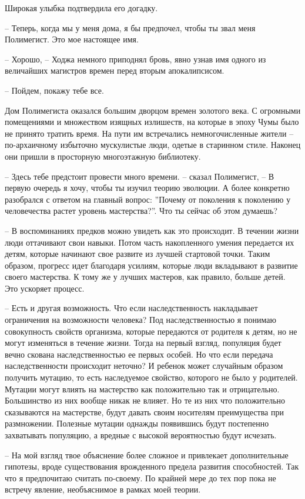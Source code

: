 \documentclass[12pt,a4paper]{article}
\begin{document}
Широкая улыбка подтвердила его догадку.

-- Теперь, когда мы у меня дома, я бы предпочел, чтобы ты звал меня Полимегист. Это мое настоящее имя.

-- Хорошо, -- Ходжа немного приподнял бровь, явно узнав имя одного из величайших магистров времен перед вторым апокалипсисом.

-- Пойдем, покажу тебе все.

Дом Полимегиста оказался большим дворцом времен золотого века. С огромными помещениями и множеством изящных излишеств, на которые в эпоху Чумы было не принято тратить время. На пути им встречались немногочисленные жители -- по-архаичному избыточно мускулистые люди, одетые в старинном стиле. Наконец они пришли в просторную многоэтажную библиотеку.

-- Здесь тебе предстоит провести много времени. -- сказал Полимегист, -- В первую очередь я хочу, чтобы ты изучил теорию эволюции. А более конкретно разобрался с ответом на главный вопрос: ''Почему от поколения к поколению у человечества растет уровень мастерства?''. Что ты сейчас об этом думаешь?

-- В воспоминаниях предков можно увидеть как это происходит. В течении жизни люди оттачивают свои навыки. Потом часть накопленного умения передается их детям, которые начинают свое развите из лучшей стартовой точки. Таким образом, прогресс идет благодаря усилиям, которые люди вкладывают в развитие своего мастерства. К тому же у лучших мастеров, как правило, больше детей. Это ускоряет процесс.

-- Есть и другая возможность. Что если наследственность накладывает ограничения на возможности человека? Под наследственностью я понимаю совокупность свойств организма, которые передаются от родителя к детям, но не могут изменяться в течение жизни. Тогда на первый взгляд, популяция будет вечно скована наследственностью ее первых особей. Но что если передача наследственности происходит неточно? И ребенок может случайным образом получить мутацию, то есть наследуемое свойство, которого не было у родителей. Мутации могут влиять на мастерство как положительно так и отрицательно. Большинство из них вообще никак не влияет. Но те из них что положительно сказываются на мастерстве, будут давать своим носителям преимущества при размножении. Полезные мутации однажды появившись будут постепенно захватывать популяцию, а вредные с высокой вероятностью будут исчезать.

-- На мой взгляд твое объяснение более сложное и привлекает дополнительные гипотезы, вроде существования врожденного предела развития способностей. Так что я предпочитаю считать по-своему. По крайней мере до тех пор пока не встречу явление, необъяснимое в рамках моей теории.
\end{document}
